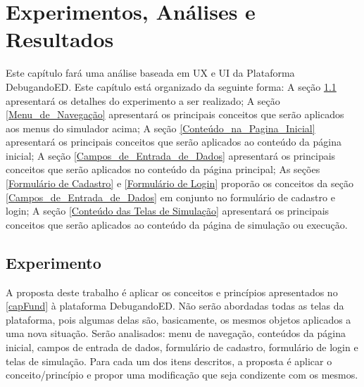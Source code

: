 \chapter[Experimentos, Análises e Resultados]{Experimentos, Análises e Resultados}
\label{capExperimentos}

Este capítulo fará uma análise baseada em \acs{UX} e \acs{UI} da Plataforma DebugandoED. Este capítulo está organizado da seguinte forma: A seção \ref{secExperimentos} apresentará os detalhes do experimento a ser realizado; A seção \ref{Menu_de_Navegação} apresentará os principais conceitos que serão aplicados aos menus do simulador acima; A seção \ref{Conteúdo_na_Pagina_Inicial} apresentará os principais conceitos que serão aplicados ao conteúdo da página inicial; A seção \ref{Campos_de_Entrada_de_Dados} apresentará os principais conceitos que serão aplicados no conteúdo da página principal; As seções \ref{Formulário de Cadastro} e \ref{Formulário de Login} proporão os conceitos da seção \ref{Campos_de_Entrada_de_Dados} em conjunto no formulário de cadastro e login; A seção \ref{Conteúdo das Telas de Simulação} apresentará os principais conceitos que serão aplicados ao conteúdo da página de simulação ou execução.


\section{Experimento}
\label{secExperimentos}

A proposta deste trabalho é aplicar os conceitos e princípios apresentados no \autoref{capFund} à plataforma DebugandoED. Não serão abordadas todas as telas da plataforma, pois algumas delas são, basicamente, os mesmos objetos aplicados a uma nova situação. Serão analisados: menu de navegação, conteúdos da página inicial, campos de entrada de dados, formulário de cadastro, formulário de login e telas de simulação. Para cada um dos itens descritos, a proposta é aplicar o conceito/princípio e propor uma modificação que seja condizente com os mesmos.

